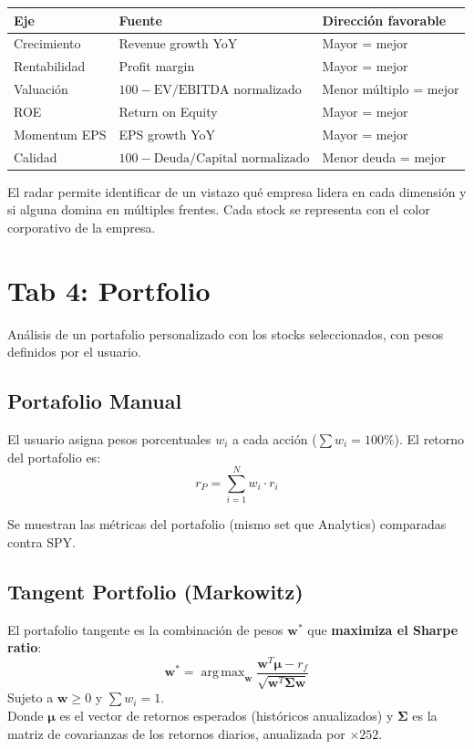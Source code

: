 \documentclass[11pt, a4paper]{article}
\DeclareMathOperator*{\argmax}{arg\,max}
\begin{document}
\begin{center}
\begin{tabular}{lll}
  \toprule
  \textbf{Eje} & \textbf{Fuente} & \textbf{Dirección favorable} \\
  \midrule
  Crecimiento    & Revenue growth YoY      & Mayor = mejor \\
  Rentabilidad   & Profit margin           & Mayor = mejor \\
  Valuación      & $100 - \text{EV/EBITDA normalizado}$ & Menor múltiplo = mejor \\
  ROE            & Return on Equity        & Mayor = mejor \\
  Momentum EPS   & EPS growth YoY          & Mayor = mejor \\
  Calidad        & $100 - \text{Deuda/Capital normalizado}$ & Menor deuda = mejor \\
  \bottomrule
\end{tabular}
\end{center}

El radar permite identificar de un vistazo qué empresa lidera en cada dimensión y si alguna domina en múltiples frentes. Cada stock se representa con el color corporativo de la empresa.

\newpage

\section{Tab 4: Portfolio}

Análisis de un portafolio personalizado con los stocks seleccionados, con pesos definidos por el usuario.

\subsection{Portafolio Manual}

El usuario asigna pesos porcentuales $w_i$ a cada acción ($\sum w_i = 100\%$). El retorno del portafolio es:
\[ r_P = \sum_{i=1}^{N} w_i \cdot r_i \]

Se muestran las métricas del portafolio (mismo set que Analytics) comparadas contra SPY.

\subsection{Tangent Portfolio (Markowitz)}

\begin{formulabox}
  El portafolio tangente es la combinación de pesos $\mathbf{w}^*$ que \textbf{maximiza el Sharpe ratio}:
  \[ \mathbf{w}^* = \argmax_{\mathbf{w}} \frac{\mathbf{w}^T \boldsymbol{\mu} - r_f}{\sqrt{\mathbf{w}^T \boldsymbol{\Sigma} \mathbf{w}}} \]
  Sujeto a $\mathbf{w} \geq 0$ y $\sum w_i = 1$.\\[6pt]
  Donde $\boldsymbol{\mu}$ es el vector de retornos esperados (históricos anualizados) y $\boldsymbol{\Sigma}$ es la matriz de covarianzas de los retornos diarios, anualizada por $\times 252$.
\end{formulabox}
\end{document}
